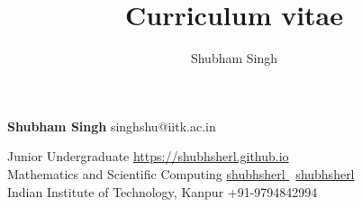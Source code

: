 \documentclass[9pt]{extarticle}
\title{Curriculum vitae}
\author{Shubham Singh}
\begin{document}

\begingroup
{}

{\Huge\textbf{\sc Shubham Singh}}
\hfill
singhshu@iitk.ac.in \faEnvelope


Junior Undergraduate
\hfill
\href{https://shubhsherl.github.io}{https://shubhsherl.github.io \faHome}\\

Mathematics and Scientific Computing
\hfill
\href{https://github.com/shubhsherl}{shubhsherl \faGithub} \textbar \ 
\href{https://www.linkedin.com/in/shubhsherl/}{shubhsherl \faLinkedin} \\

Indian Institute of Technology, Kanpur
\hfill
+91-9794842994 \faMobile \\

\begin{minipage}[t]{0.49\textwidth}
  \vspace{7mm}
  
\end{minipage}
\begin{minipage}[t]{0.49\textwidth}
  \vspace{7mm}
  
  \vspace{1mm}
  
  \vspace{1mm}
  
%   
\vspace{1mm}
  
  \vspace{1mm}
  
\end{minipage}
\hfill



\endgroup
\end{document}
